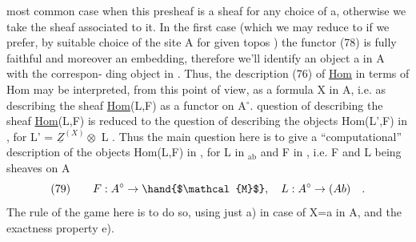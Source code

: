 most common case when this presheaf is  a sheaf for any choice of
a,  otherwise we take the sheaf associated to it.  In the first case
(which we may reduce to if we prefer,  by suitable choice of the site A
for given topos ) the functor (78) is fully faithful and moreover an
embedding,  therefore we'll identify an object a in A with the correspon-%
ding object in .  Thus,  the description (76) of \uline{Hom} in terms of Hom may
be interpreted,  from this point of view,  as a formula  X in A,
i.e. as describing the sheaf \uline{Hom}(L,F) as a functor on A$^{\circ}$.  
question of describing the sheaf \uline{Hom}(L,F) is reduced to the question of
describing the objects  Hom(L',F)  in ,  for L' = $\underline{Z}^{(X)}\otimes$ L .  Thus the
main question here is to give a ``computational'' description of the objects
Hom(L,F) in ,  for L in $_{\mathrm{ab}}$  and F in ,  i.e. F and L being
sheaves on A
\[ (79) \qquad F: A^{\circ} \to \hand{$\mathcal{M}$}, \quad L : A^{\circ} \to (Ab) \quad . \]
The rule of the game here is to do so,  using just a) in case of X=a in A,
and the exactness property e).

